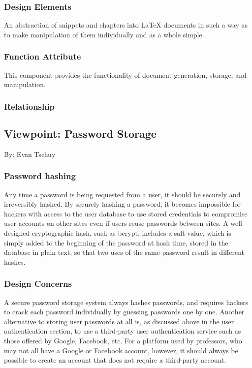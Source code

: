 \documentclass[letterpaper, 10pt, draftclsnofoot, compsoc, onecolumn]{IEEEtran}
\begin{document}
\subsubsection{Design Elements}
An abstraction of snippets and chapters into LaTeX documents in such a way as to
make manipulation of them individually and as a whole simple.
{\noindent  \par}

\subsubsection{Function Attribute}
This component provides the functionality of document generation, storage, and
manipulation.
{\noindent  \par}

\subsubsection{Relationship}


\subsection{Viewpoint: Password Storage}
{\noindent By: Evan Tschuy \par}

\subsubsection{Password hashing}
Any time a password is being requested from a user, it should be securely and
irreversibly hashed. By securely hashing a password, it becomes impossible for
hackers with access to the user database to use stored credentials to compromise
user accounts on other sites even if users reuse passwords between sites. A well
designed cryptographic hash, such as bcrypt, includes a salt value, which is
simply added to the beginning of the password at hash time, stored in the
database in plain text, so that two uses of the same password result in
different hashes.
{\noindent  \par}

\subsubsection{Design Concerns}
A secure password storage system always hashes passwords, and requires hackers
to crack each password individually by guessing passwords one by one. Another
alternative to storing user passwords at all is, as discussed above in the user
authentication section, to use a third-party user authentication service such as
those offered by Google, Facebook, etc. For a platform used by professors, who
may not all have a Google or Facebook account, however, it should always be
possible to create an account that does not require a third-party account.
{\noindent  \par}
\end{document}
